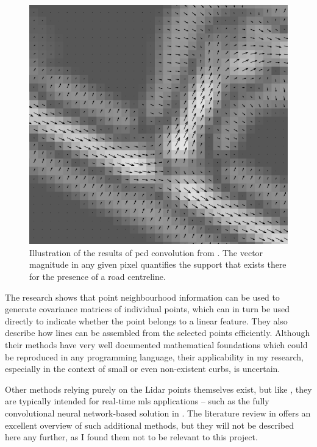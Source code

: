 \begin{figure}
    \includegraphics[width=\linewidth]{final_report/figs/clode_etal_2007_01.png} 
    \caption[Illustration of the results of PCD convolution]{Illustration of the results of \ac{pcd} convolution from \cite{clode_etal_2007}. The vector magnitude in any given pixel quantifies the support that exists there for the presence of a road centreline.}
    \label{fig:phasecodeddisk}
\end{figure}

The research \cite{gross_thoennessen_2006} shows that point neighbourhood information can be used to generate covariance matrices of individual points, which can in turn be used directly to indicate whether the point belongs to a linear feature. They also describe how lines can be assembled from the selected points efficiently. Although their methods have very well documented mathematical foundations which could be reproduced in any programming language, their applicability in my research, especially in the context of small or even non-existent curbs, is uncertain.

Other methods relying purely on the Lidar points themselves exist, but like \cite{zhang_2010}, they are typically intended for real-time \ac{mls} applications – such as the fully convolutional neural network-based solution in \cite{caltagirone_etal_2017}. The literature review in \cite{yang_etal_2013} offers an excellent overview of such additional methods, but they will not be described here any further, as I found them not to be relevant to this project.

